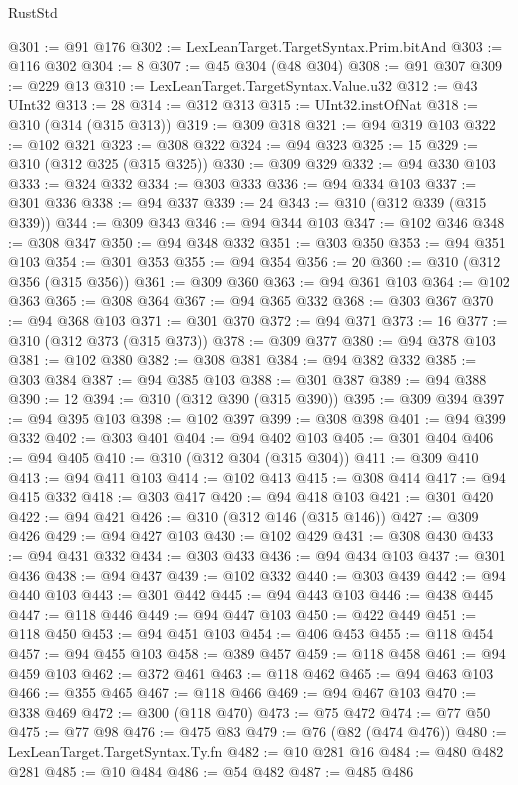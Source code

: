 \begin{lexlean}{RustStd}
\begin{coremodule}
{\begin{coremodule}
{{{{{{{{{{{{{{{{{{{{{{{{{{{{{{{{{{{{{@301 := @91 @176
@302 := LexLeanTarget.TargetSyntax.Prim.bitAnd
@303 := @116 @302
@304 := 8
@307 := @45 @304 (@48 @304)
@308 := @91 @307
@309 := @229 @13
@310 := LexLeanTarget.TargetSyntax.Value.u32
@312 := @43 UInt32
@313 := 28
@314 := @312 @313
@315 := UInt32.instOfNat
@318 := @310 (@314 (@315 @313))
@319 := @309 @318
@321 := @94 @319 @103
@322 := @102 @321
@323 := @308 @322
@324 := @94 @323
@325 := 15
@329 := @310 (@312 @325 (@315 @325))
@330 := @309 @329
@332 := @94 @330 @103
@333 := @324 @332
@334 := @303 @333
@336 := @94 @334 @103
@337 := @301 @336
@338 := @94 @337
@339 := 24
@343 := @310 (@312 @339 (@315 @339))
@344 := @309 @343
@346 := @94 @344 @103
@347 := @102 @346
@348 := @308 @347
@350 := @94 @348 @332
@351 := @303 @350
@353 := @94 @351 @103
@354 := @301 @353
@355 := @94 @354
@356 := 20
@360 := @310 (@312 @356 (@315 @356))
@361 := @309 @360
@363 := @94 @361 @103
@364 := @102 @363
@365 := @308 @364
@367 := @94 @365 @332
@368 := @303 @367
@370 := @94 @368 @103
@371 := @301 @370
@372 := @94 @371
@373 := 16
@377 := @310 (@312 @373 (@315 @373))
@378 := @309 @377
@380 := @94 @378 @103
@381 := @102 @380
@382 := @308 @381
@384 := @94 @382 @332
@385 := @303 @384
@387 := @94 @385 @103
@388 := @301 @387
@389 := @94 @388
@390 := 12
@394 := @310 (@312 @390 (@315 @390))
@395 := @309 @394
@397 := @94 @395 @103
@398 := @102 @397
@399 := @308 @398
@401 := @94 @399 @332
@402 := @303 @401
@404 := @94 @402 @103
@405 := @301 @404
@406 := @94 @405
@410 := @310 (@312 @304 (@315 @304))
@411 := @309 @410
@413 := @94 @411 @103
@414 := @102 @413
@415 := @308 @414
@417 := @94 @415 @332
@418 := @303 @417
@420 := @94 @418 @103
@421 := @301 @420
@422 := @94 @421
@426 := @310 (@312 @146 (@315 @146))
@427 := @309 @426
@429 := @94 @427 @103
@430 := @102 @429
@431 := @308 @430
@433 := @94 @431 @332
@434 := @303 @433
@436 := @94 @434 @103
@437 := @301 @436
@438 := @94 @437
@439 := @102 @332
@440 := @303 @439
@442 := @94 @440 @103
@443 := @301 @442
@445 := @94 @443 @103
@446 := @438 @445
@447 := @118 @446
@449 := @94 @447 @103
@450 := @422 @449
@451 := @118 @450
@453 := @94 @451 @103
@454 := @406 @453
@455 := @118 @454
@457 := @94 @455 @103
@458 := @389 @457
@459 := @118 @458
@461 := @94 @459 @103
@462 := @372 @461
@463 := @118 @462
@465 := @94 @463 @103
@466 := @355 @465
@467 := @118 @466
@469 := @94 @467 @103
@470 := @338 @469
@472 := @300 (@118 @470)
@473 := @75 @472
@474 := @77 @50
@475 := @77 @98
@476 := @475 @83
@479 := @76 (@82 (@474 @476))
@480 := LexLeanTarget.TargetSyntax.Ty.fn
@482 := @10 @281 @16
@484 := @480 @482 @281
@485 := @10 @484
@486 := @54 @482
@487 := @485 @486
}}}}}}}}}}}}}}}}}}}}}}}}}}}}}}}}}}}}}
\end{coremodule}}
\end{coremodule}
\end{lexlean}
